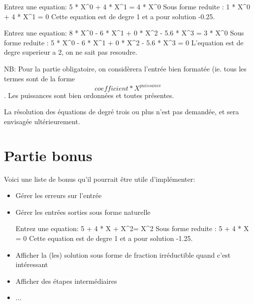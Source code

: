 \documentclass{42}
\begin{document}
\begin{42console}
Entrez une equation: 5 * X^0 + 4 * X^1 = 4 * X^0
Sous forme reduite : 1 * X^0 + 4 * X^1 = 0
Cette equation est de degre 1 et a pour solution -0.25.
\end{42console}

\begin{42console}
Entrez une equation: 8 * X^0 - 6 * X^1 + 0 * X^2 - 5.6 * X^3 = 3 * X^0
Sous forme reduite : 5 * X^0 - 6 * X^1 + 0 * X^2 - 5.6 * X^3 = 0
L'equation est de degre superieur a 2, on ne sait pas resoudre.
\end{42console}

NB: Pour la partie obligatoire, on considèrera l'entrée bien formatée (ie. tous les termes sont de la forme \begin{equation}coefficient * X^{puissance}\end{equation}. Les puissances sont bien ordonnées et toutes présentes.

\info
{
	La résolution des équations de degré trois ou plus n'est pas demandée, et sera envisagée ultérieurement.
}

\newpage

\chapter{Partie bonus}

Voici une liste de bonus qu'il pourrait être utile d'implémenter:



\begin{itemize}
	\item Gérer les erreurs sur l'entrée
	\item Gérer les entrées sorties sous forme naturelle
\begin{42console}
Entrez une equation: 5 + 4 * X + X^2= X^2
Sous forme reduite : 5 + 4 * X = 0
Cette equation est de degre 1 et a pour solution -1.25.
\end{42console}
	\item Afficher la (les) solution sous forme de fraction irréductible quand c'est intéressant
	\item Afficher des étapes intermédiaires
	\item ...
\end{itemize}
\end{document}
